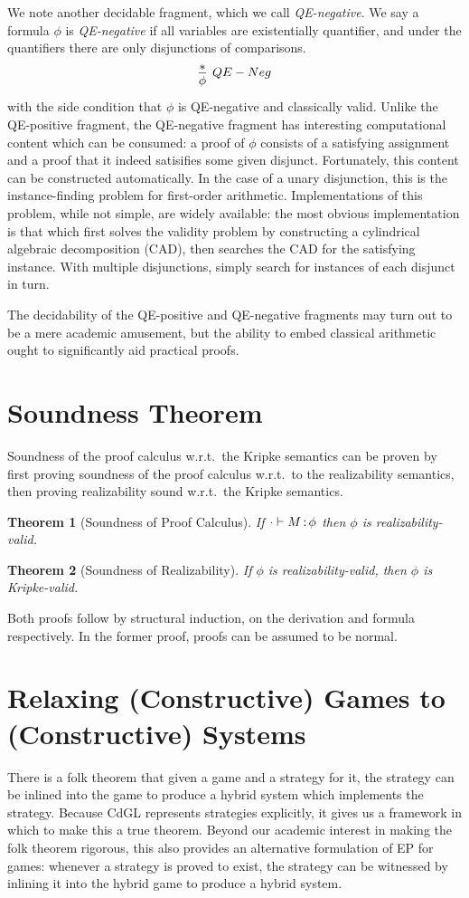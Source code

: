 \documentclass[12pt]{cmuthesis}
\newtheorem{theorem}{Theorem}
\theoremstyle{definition}
\theoremstyle{remark}
\newcommand{\CdGL}{\textsf{CdGL}\xspace}
\begin{document}
We note another decidable fragment, which we call \emph{QE-negative}.
We say a formula $\phi$ is \emph{QE-negative} if all variables are existentially quantifier, and under the quantifiers there are  only disjunctions of comparisons.
\[\infer[QE-Neg]{\phi}{*}\] with the side condition that $\phi$ is  QE-negative and classically valid.
Unlike the QE-positive fragment, the QE-negative fragment has interesting computational content which can be consumed: a proof of $\phi$ consists of a satisfying assignment and a proof that it indeed satisifies some given disjunct.
Fortunately, this content can be constructed automatically.
In the case of a unary disjunction, this is the instance-finding problem for first-order arithmetic.
Implementations of this problem, while not simple, are widely available: the most obvious implementation is that which first solves the validity problem by constructing a cylindrical algebraic decomposition (CAD), then searches the CAD for the satisfying instance.
With multiple disjunctions, simply search for instances of each disjunct in turn.

The decidability of the QE-positive and QE-negative fragments may turn out to be a mere academic amusement, but the ability to embed classical arithmetic ought to significantly aid practical proofs.

\section{Soundness Theorem}
Soundness of the proof calculus w.r.t.\ the Kripke semantics can be proven by first proving soundness of the proof calculus w.r.t.\ to the realizability semantics,
then proving realizability sound w.r.t.\ the Kripke semantics.
\begin{theorem}[Soundness of Proof Calculus]
  If $\cdot \vdash M\mathop{:}\phi$ then $\phi$ is realizability-valid.
\end{theorem}
\begin{theorem}[Soundness of Realizability]
  If $\phi$ is realizability-valid, then $\phi$ is Kripke-valid.
\end{theorem}
Both proofs follow by structural induction, on the derivation and formula respectively.
In the former proof, proofs can be assumed to be normal.

\section{Relaxing (Constructive) Games to (Constructive) Systems}
There is a folk theorem that given a game and a strategy for it, the strategy can be inlined into the game to produce a hybrid system which implements the strategy.
Because \CdGL represents strategies explicitly, it gives us a framework in which to make this a true theorem.
Beyond our academic interest in making the folk theorem rigorous, this also provides an alternative formulation of EP for games: whenever a strategy is proved to exist, the strategy can be witnessed by inlining it into the hybrid game to produce a hybrid system.
\end{document}
